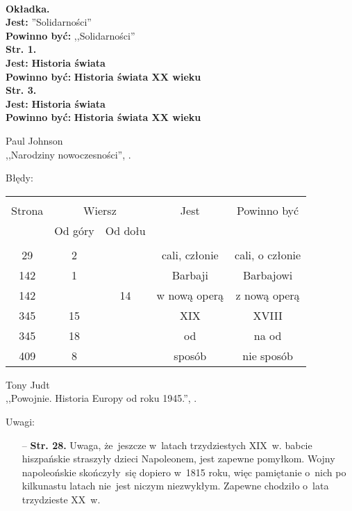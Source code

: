\documentclass[a4paper,11pt]{article}
\newcommand{\tb}{\textbf}
\newcommand{\Str}[1]{\textbf{Str. #1.}}
\newcommand{\Jest}{\textbf{Jest: }}
\newcommand{\Pow}{\textbf{Powinno być: }}
\begin{document}
\noindent\\
\tb{Okładka.} \\
\Jest ''Solidarności'' \\
\Pow ,,Solidarności'' \\
\Str{1} \\
\Jest \tb{Historia świata} \\
\Pow \tb{Historia świata XX wieku} \\
\Str{3} \\
\Jest \tb{Historia świata} \\
\Pow \tb{Historia świata XX wieku} \\

\begin{center}
  Paul Johnson\\
  ,,Narodziny nowoczesności'', \cite{Joh95}.
\end{center}

Błędy:\\
\begin{center}
  \begin{tabular}{|c|c|c|c|c|}
    \hline
    & \multicolumn{2}{c|}{} & & \\
    Strona & \multicolumn{2}{c|}{Wiersz}& Jest & Powinno być \\ \cline{2-3}
    & Od góry & Od dołu &  &  \\ \hline
    & & & & \\
    29 & 2 & & cali, członie & cali, o członie \\
    142 & 1 & & Barbaji & Barbajowi \\
    142 & & 14 & w nową operą & z nową operą \\
    345 & 15 & & XIX & XVIII \\
    345 & 18 & & od & na od \\
    409 & 8 & & sposób & nie sposób \\ \hline
  \end{tabular}
\end{center}

\begin{center}
  Tony Judt \\
  ,,Powojnie. Historia Europy od roku 1945.'', \cite{Jud13}.
\end{center}

Uwagi:
\begin{itemize}
\item[--] \Str{28} Uwaga, że~jeszcze w~latach trzydziestych
  XIX~w. babcie hiszpańskie straszyły dzieci Napoleonem, jest zapewne
  pomyłkom. Wojny napoleońskie skończyły~się dopiero w~1815 roku, więc
  pamiętanie o~nich po kilkunastu latach nie~jest niczym
  niezwykłym. Zapewne chodziło o~lata trzydzieste XX~w.
\end{itemize}
\end{document}

